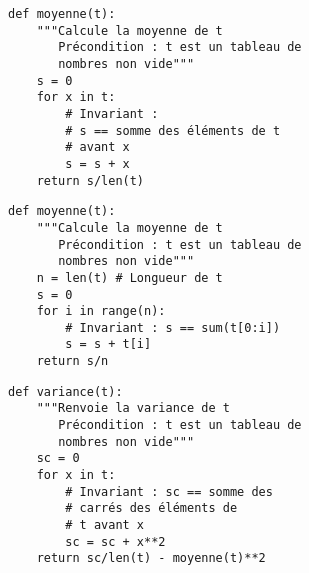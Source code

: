 \exer{}
\setcounter{numques}{0}


\begin{lstlisting}
def moyenne(t):
    """Calcule la moyenne de t
       Précondition : t est un tableau de 
       nombres non vide"""
    s = 0 
    for x in t:
        # Invariant : 
        # s == somme des éléments de t 
        # avant x
        s = s + x 
    return s/len(t)
\end{lstlisting}

\begin{lstlisting}
def moyenne(t):
    """Calcule la moyenne de t
       Précondition : t est un tableau de 
       nombres non vide"""
    n = len(t) # Longueur de t
    s = 0 
    for i in range(n):
        # Invariant : s == sum(t[0:i])
        s = s + t[i]
    return s/n 
\end{lstlisting}


\begin{lstlisting}
def variance(t):
    """Renvoie la variance de t
       Précondition : t est un tableau de 
       nombres non vide"""
    sc = 0
    for x in t:
        # Invariant : sc == somme des 
        # carrés des éléments de 
        # t avant x
        sc = sc + x**2 
    return sc/len(t) - moyenne(t)**2
\end{lstlisting}
